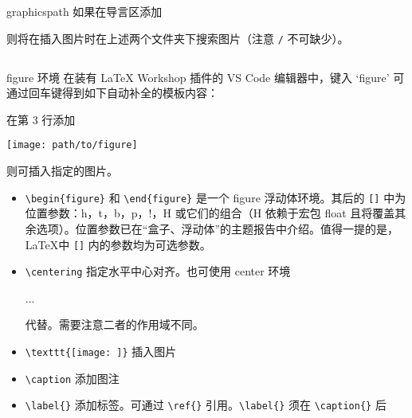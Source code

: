 \documentclass[]{ctexbeamer}
\begin{document}
\begin{frame}[fragile]{graphicspath}
如果在导言区添加
\begin{texlst}
\graphicspath{{Demos/}{Images/}}
\end{texlst}
则将在插入图片时在上述两个文件夹下搜索图片（注意 \verb+/+ 不可缺少）。
\end{frame}


\subsection{}
\begin{frame}[fragile]{figure 环境}
在装有 LaTeX Workshop 插件的 VS Code 编辑器中，键入 `figure' 可通过回车键得到如下自动补全的模板内容：
\begin{texlst}
\begin{figure}[]
  \centering
  
  \caption{}
  \label{}
\end{figure}
\end{texlst}
在第 3 行添加
\begin{texlst}
\texttt{[image: path/to/figure]}
\end{texlst}
则可插入指定的图片。
\end{frame}


\begin{frame}[fragile]
\begin{itemize}
  \item \verb+\begin{figure}+ 和 \verb+\end{figure}+ 是一个 figure 浮动体环境。其后的 \verb+[]+ 中为位置参数：h，t，b，p，!，H 或它们的组合（H 依赖于宏包 float 且将覆盖其余选项）。位置参数已在“盒子、浮动体”的主题报告中介绍。值得一提的是，\LaTeX 中 \verb+[]+ 内的参数均为可选参数。
  \item \verb+\centering+ 指定水平中心对齐。也可使用 center 环境 \\
    \begin{texlst}[numbers=none]
    \begin{center}
    ...
    \end{center}
    \end{texlst}
    代替。需要注意二者的作用域不同。
  \item \verb+\texttt{[image: ]}+ 插入图片
  \item \verb+\caption+ 添加图注
  \item \verb+\label{}+ 添加标签。可通过 \verb+\ref{}+ 引用。\verb+\label{}+ 须在 \verb+\caption{}+ 后
\end{itemize}
\end{frame}
\end{document}
